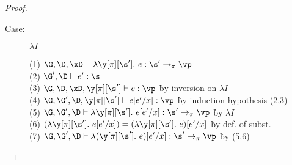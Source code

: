 \begin{proof}
\begin{description}
\item[Case:] $\lambda I$
\begin{tabbing}
    (1) $\G, \D, \xD \vdash \lambda \y[\pi][\s'].~e : \s' \to_\pi \vp$\\
    (2) $\G', \D \vdash e' : \s$\\
    (3) $\G, \D, \xD, \y[\pi][\s'] \vdash e : \vp$ \` by inversion on $\lambda I$\\
    (4) $\G, \G', \D, \y[\pi][\s'] \vdash e[e'/x] : \vp$ \` by induction hypothesis (2,3)\\
    (5) $\G, \G', \D \vdash \lambda \y[\pi][\s'].~e[e'/x] : \s' \to_\pi \vp$ \` by $\lambda I$\\
    (6) $(\lambda \y[\pi][\s'].~e[e'/x]) = (\lambda \y[\pi][\s'].~e)[e'/x]$ \` by def. of subst.\\
    (7) $\G, \G', \D \vdash \lambda (\y[\pi][\s'].~e)[e'/x] : \s' \to_\pi \vp$ \` by (5,6)\\
\end{tabbing}


\end{description}

\end{proof}

